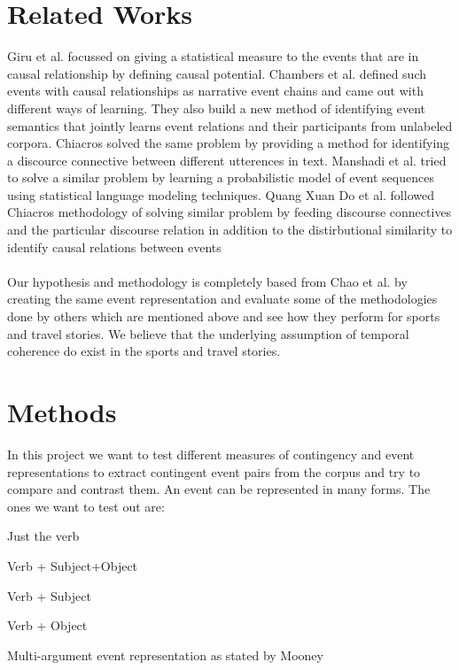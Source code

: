\documentclass[11pt]{article}
\begin{document}
\section{Related Works}
Giru et al. focussed on giving a statistical measure to the events that are in causal relationship by defining causal potential\cite{cp}. Chambers et al. defined such events with causal relationships as narrative event chains and came out with different ways of learning\cite{nec}. They also build a new method of identifying event semantics that jointly learns event relations and their participants from unlabeled corpora\cite{cloze}. Chiacros solved the same problem by providing a method for identifying a discource connective between different utterences in text\cite{chiacro}. Manshadi et al. tried to solve a similar problem by  learning a probabilistic model of event sequences using statistical language modeling techniques\cite{manshadi}. Quang Xuan Do et al. followed Chiacros methodology of solving similar problem by feeding discourse connectives and the particular discourse relation in addition to the distirbutional similarity to identify causal relations between events\cite{do} \\
\smallskip \\
Our hypothesis and methodology is completely based from Chao et al.\cite{film} by creating the same event representation and evaluate some of the methodologies done by others which are mentioned above and see how they perform for sports and travel stories. We believe that the underlying assumption of temporal coherence do exist in the sports and travel stories.  


\section{Methods}
In this project we want to test different measures of contingency and event representations to extract contingent event pairs from the corpus and try to compare and contrast them. An event can be represented in many forms. The ones we want to test out are:
\begin{enumerate*}[label=\itshape\alph*\upshape)]
\item Just the verb
\item Verb + Subject+Object
\item Verb + Subject
\item Verb + Object
\item Multi-argument event representation as stated by Mooney \cite{mooney}
\end{enumerate*}    
\end{document}
